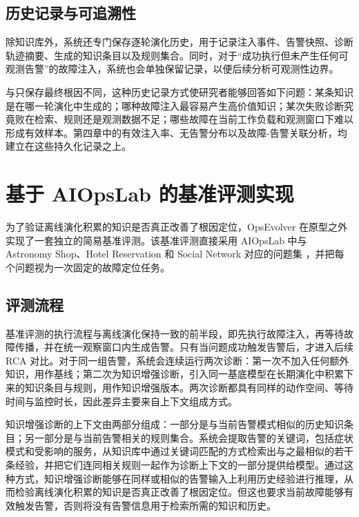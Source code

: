 \subsection{历史记录与可追溯性}

除知识库外，系统还专门保存逐轮演化历史，用于记录注入事件、告警快照、诊断轨迹摘要、生成的知识条目以及规则集合。同时，对于“成功执行但未产生任何可观测告警”的故障注入，系统也会单独保留记录，以便后续分析可观测性边界。

与只保存最终根因不同，这种历史记录方式使研究者能够回答如下问题：某条知识是在哪一轮演化中生成的；哪种故障注入最容易产生高价值知识；某次失败诊断究竟败在检索、规则还是观测数据不足；哪些故障在当前工作负载和观测窗口下难以形成有效样本。第四章中的有效注入率、无告警分布以及故障-告警关联分析，均建立在这些持久化记录之上。

\section{基于 AIOpsLab 的基准评测实现}
\label{sec:benchmark_impl}

为了验证离线演化积累的知识是否真正改善了根因定位，OpsEvolver 在原型之外实现了一套独立的简易基准评测。该基准评测直接采用 AIOpsLab 中与 Astronomy Shop、Hotel Reservation 和 Social Network 对应的问题集 \cite{chen2025aiopslab}，并把每个问题视为一次固定的故障定位任务。

\subsection{评测流程}

基准评测的执行流程与离线演化保持一致的前半段，即先执行故障注入，再等待故障传播，并在统一观察窗口内生成告警。只有当问题成功触发告警后，才进入后续 RCA 对比。对于同一组告警，系统会连续运行两次诊断：第一次不加入任何额外知识，用作基线；第二次为知识增强诊断，引入同一基底模型在长期演化中积累下来的知识条目与规则，用作知识增强版本。两次诊断都具有同样的动作空间、等待时间与监控时长，因此差异主要来自上下文组成方式。

知识增强诊断的上下文由两部分组成：一部分是与当前告警模式相似的历史知识条目；另一部分是与当前告警相关的规则集合。系统会提取告警的关键词，包括症状模式和受影响的服务，从知识库中通过关键词匹配的方式检索出与之最相似的若干条经验，并把它们连同相关规则一起作为诊断上下文的一部分提供给模型。通过这种方式，知识增强诊断能够在同样或相似的告警输入上利用历史经验进行推理，从而检验离线演化积累的知识是否真正改善了根因定位。但这也要求当前故障能够有效触发告警，否则将没有告警信息用于检索所需的知识和历史。

